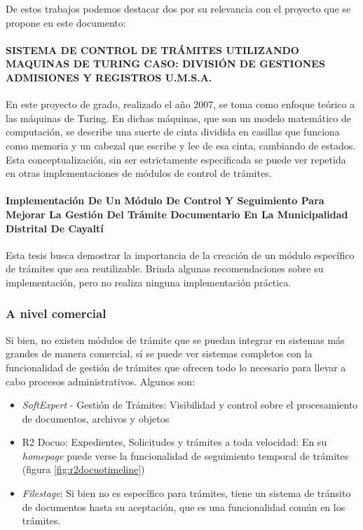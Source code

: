 De estos trabajos podemos destacar dos por su relevancia con el proyecto que se propone en este documento:

\paragraph{SISTEMA DE CONTROL DE TRÁMITES UTILIZANDO MAQUINAS DE TURING CASO: DIVISIÓN DE GESTIONES ADMISIONES Y REGISTROS U.M.S.A.}

En este proyecto de grado, realizado el año 2007, se toma como enfoque teórico a las máquinas de Turing. En dichas máquinas, que son un modelo matemático de computación, se describe una suerte de cinta dividida en casillas que funciona como memoria y un cabezal que escribe y lee de esa cinta, cambiando de estados. Esta conceptualización, sin ser estrictamente especificada se puede ver repetida en otras implementaciones de módulos de control de trámites.

\paragraph{Implementación De Un Módulo De Control Y Seguimiento Para Mejorar La Gestión Del Trámite Documentario En La Municipalidad Distrital De Cayaltí}

Esta tesis busca demostrar la importancia de la creación de un módulo específico de trámites que sea reutilizable. Brinda algunas recomendaciones sobre su implementación, pero no realiza ninguna implementación práctica.

\subsubsection{A nivel comercial}

Si bien, no existen módulos de trámite que se puedan integrar en sistemas más grandes de manera comercial, sí se puede ver sistemas completos con la funcionalidad de gestión de trámites que ofrecen todo lo necesario para llevar a cabo procesos administrativos. Algunos son:

\begin{itemize}
    \item \textit{SoftExpert} - Gestión de Trámites: Visibilidad y control sobre el procesamiento de documentos, archivos y objetos
    \item R2 Docuo: Expedientes, Solicitudes y trámites a toda velocidad: En su \textit{homepage} puede verse la funcionalidad de seguimiento temporal de trámites (figura \ref{fig:r2docuotimeline})
    \item \textit{Filestage}: Si bien no es específico para trámites, tiene un sistema de tránsito de documentos hasta su aceptación, que es una funcionalidad común en los trámites.
\end{itemize}

